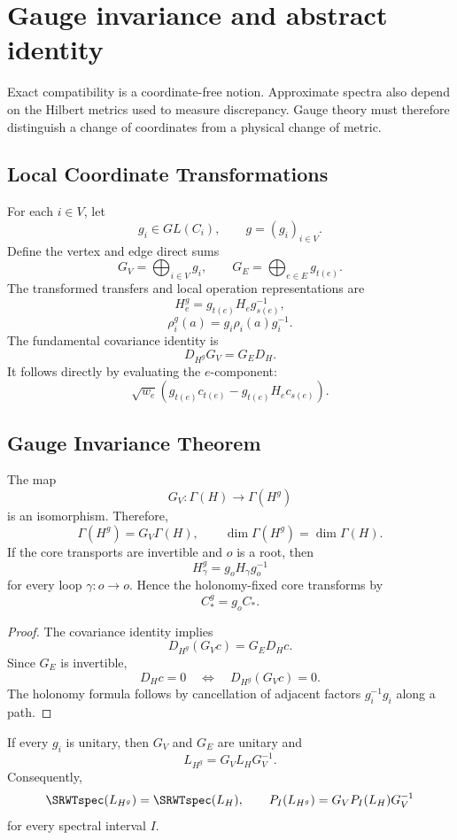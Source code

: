 \chapter{Gauge invariance and abstract identity}\label{SRWT:book:chapter-71}


Exact compatibility is a coordinate-free notion. Approximate spectra also
depend on the Hilbert metrics used to measure discrepancy. Gauge theory must
therefore distinguish a change of coordinates from a physical change of
metric.

\section{Local Coordinate Transformations}

For each \(i\in V\), let
\[
g_i\in GL(C_i),
\qquad
g=(g_i)_{i\in V}.
\]
Define the vertex and edge direct sums
\[
G_V=\bigoplus_{i\in V}g_i,
\qquad
G_E=\bigoplus_{e\in E}g_{t(e)}.
\]
The transformed transfers and local operation representations are
\[
H_e^g
=
 g_{t(e)}H_eg_{s(e)}^{-1},
\]
\[
\rho_i^g(a)
=
 g_i\rho_i(a)g_i^{-1}.
\]
The fundamental covariance identity is
\[
\boxed{
D_{H^g}G_V=G_ED_H.
}
\]
It follows directly by evaluating the \(e\)-component:
\[
\sqrt{w_e}
\left(
 g_{t(e)}c_{t(e)}
-
 g_{t(e)}H_ec_{s(e)}
\right).
\]

\section{Gauge Invariance Theorem}

\begin{SRWTtheorem}\label{SRWT:thm:gauge-covariance}
The map
\[
G_V:\Gamma(H)\longrightarrow\Gamma(H^g)
\]
is an isomorphism. Therefore,
\[
\boxed{
\Gamma(H^g)=G_V\Gamma(H),
\qquad
\dim\Gamma(H^g)=\dim\Gamma(H).
}
\]
If the core transports are invertible and \(o\) is a root, then
\[
H_\gamma^g=g_oH_\gamma g_o^{-1}
\]
for every loop \(\gamma:o\to o\). Hence the holonomy-fixed core transforms by
\[
C_*^g=g_oC_*.
\]
\end{SRWTtheorem}

\begin{proof}
The covariance identity implies
\[
D_{H^g}(G_Vc)=G_ED_Hc.
\]
Since \(G_E\) is invertible,
\[
D_Hc=0
\quad\Longleftrightarrow\quad
D_{H^g}(G_Vc)=0.
\]
The holonomy formula follows by cancellation of adjacent factors
\(g_i^{-1}g_i\) along a path.
\end{proof}

\begin{SRWTtheorem}\label{SRWT:thm:unitary-gauge}
If every \(g_i\) is unitary, then \(G_V\) and \(G_E\) are unitary and
\[
\boxed{
L_{H^g}=G_VL_HG_V^{-1}.
}
\]
Consequently,
\[
\SRWTspec(L_{H^g})=\SRWTspec(L_H),
\qquad
P_I(L_{H^g})=G_VP_I(L_H)G_V^{-1}
\]
for every spectral interval \(I\).
\end{SRWTtheorem}

